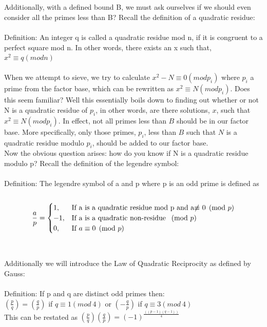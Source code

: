 \documentclass[12pt]{article} %
\begin{document}
	\\\\
	Additionally, with a defined bound B, we must ask ourselves if we should even consider all the primes less than B? Recall the definition of a quadratic residue:
	\\\\
	Definition: An integer q is called a quadratic residue mod n, if it is congruent to a perfect square mod n. In other words, there exists an x such that, $x^{2} \equiv q(mod  n)$ 
	\\\\
	When we attempt to sieve, we try to calculate $x^{2}-N\equiv 0(mod p_i)$ where $p_i$ a prime from the factor base, which can be rewritten as $x^{2} \equiv N(mod p_i)$. Does this seem familiar? Well this essentially boils down to finding out whether or not N is a quadratic residue of $p_i$, in other words, are there solutions, $x$, such that $x^{2}\equiv N(mod p_i)$. In effect, not all primes less than $B$ should be in our factor base. More specifically, only those primes, $p_i$, less than $B$ such that $N$ is a quadratic residue modulo $p_i$, should be added to our factor base. 
	\\\indent Now the obvious question arises: how do you know if N is a quadratic residue modulo p? Recall the definition of the legendre symbol:
	\\\\
	Definition: The legendre symbol of a and p where p is an odd prime is defined as 
	\\\\
	$$
	\frac{a}{p} = \begin{cases}
	1, & \textmd{If a is a quadratic residue mod p and a$\not\equiv$ 0$\pmod{p}$}\\
	-1, & \textmd{If a is a quadratic non-residue $\pmod{p}$}\\
	0, & \textmd{If $a\equiv 0 \pmod{p}$}\\
	\end{cases}
	$$
	\\\\Additionally we will introduce the Law of Quadratic Reciprocity as defined by Gauss:
	\\\\Definition: If p and q are distinct odd primes then:
	\\$\left(\frac{p}{q}\right) = \left(\frac{q}{p}\right)$ if $q\equiv 1(mod\ 4)$ or $\left(-\frac{q}{p}\right)$ if $q\equiv 3(mod\ 4)$
	\\This can be restated as $\left(\frac{p}{q}\right)\left(\frac{q}{p}\right) = \left(-1\right)^{\frac{\left((p-1)(q-1)\right)}{4}}$
\end{document}
